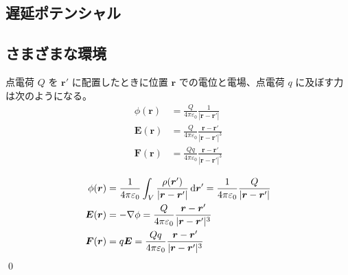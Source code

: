 \documentclass[uplatex,dvipdfmx,a4paper,11pt]{jlreq}
\makeatletter
\newcommand{\EE}{\bm{E}}
\newcommand{\rr}{\bm{r}}
\newcommand{\vnabla}{\mathbf{\nabla}}
\numberwithin{equation}{section}
\theoremstyle{definition}
\renewenvironment{proof}[1][\proofname]{\par
  \normalfont
  \topsep6\p@\@plus6\p@ \trivlist
  \item[\hskip\labelsep{\bfseries #1}\@addpunct{\bfseries}]\ignorespaces\quad\par
}{%
  \qed\endtrivlist\@endpefalse
}
\renewcommand\proofname{証明}
\makeatother
\begin{document}
\subsection{遅延ポテンシャル}

\subsection{さまざまな環境}
\begin{theorem}[Coulomb 力]
  点電荷 $Q$ を $\rr'$ に配置したときに位置 $\rr$ での電位と電場、点電荷 $q$ に及ぼす力は次のようになる。
  \begin{align}
    \phi(\rr)   & = \frac{Q}{4\pi\varepsilon_0}\frac{1}{|\rr - \rr'|}             \\
    \EE(\rr)    & = \frac{Q}{4\pi\varepsilon_0}\frac{\rr - \rr'}{|\rr - \rr'|^3}  \\
    \bm{F}(\rr) & = \frac{Qq}{4\pi\varepsilon_0}\frac{\rr - \rr'}{|\rr - \rr'|^3}
  \end{align}
\end{theorem}
\begin{proof}
  \begin{align}
    \phi(\rr)   & = \frac{1}{4\pi\varepsilon_0}\int_V\frac{\rho(\rr')}{|\rr - \rr'|}\dl{\rr'} = \frac{1}{4\pi\varepsilon_0}\frac{Q}{|\rr - \rr'|} \\
    \EE(\rr)    & = -\vnabla\phi = \frac{Q}{4\pi\varepsilon_0}\frac{\rr - \rr'}{|\rr - \rr'|^3}                                                   \\
    \bm{F}(\rr) & = q\EE = \frac{Qq}{4\pi\varepsilon_0}\frac{\rr - \rr'}{|\rr - \rr'|^3}
  \end{align}
\end{proof}
\end{document}
